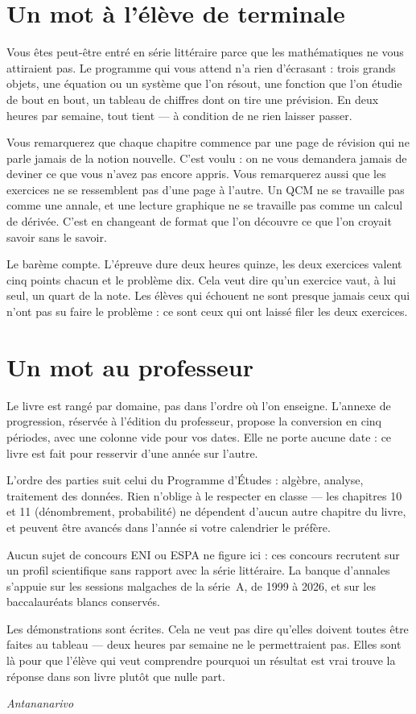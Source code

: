 \section*{Un mot à l'élève de terminale}

Vous êtes peut-être entré en série littéraire parce que les mathématiques ne
vous attiraient pas. Le programme qui vous attend n'a rien d'écrasant : trois
grands objets, une équation ou un système que l'on résout, une fonction que
l'on étudie de bout en bout, un tableau de chiffres dont on tire une
prévision. En deux heures par semaine, tout tient — à condition de ne rien
laisser passer.

Vous remarquerez que chaque chapitre commence par une page de révision qui ne
parle jamais de la notion nouvelle. C'est voulu : on ne vous demandera jamais
de deviner ce que vous n'avez pas encore appris. Vous remarquerez aussi que
les exercices ne se ressemblent pas d'une page à l'autre. Un QCM ne se
travaille pas comme une annale, et une lecture graphique ne se travaille pas
comme un calcul de dérivée. C'est en changeant de format que l'on découvre ce
que l'on croyait savoir sans le savoir.

Le barème compte. L'épreuve dure deux heures quinze, les deux exercices
valent cinq points chacun et le problème dix. Cela veut dire qu'un exercice
vaut, à lui seul, un quart de la note. Les élèves qui échouent ne sont
presque jamais ceux qui n'ont pas su faire le problème : ce sont ceux qui ont
laissé filer les deux exercices.

\section*{Un mot au professeur}

Le livre est rangé par domaine, pas dans l'ordre où l'on enseigne. L'annexe
de progression, réservée à l'édition du professeur, propose la conversion en
cinq périodes, avec une colonne vide pour vos dates. Elle ne porte aucune
date : ce livre est fait pour resservir d'une année sur l'autre.

L'ordre des parties suit celui du Programme d'Études : algèbre, analyse,
traitement des données. Rien n'oblige à le respecter en classe — les
chapitres 10 et 11 (dénombrement, probabilité) ne dépendent d'aucun autre
chapitre du livre, et peuvent être avancés dans l'année si votre calendrier
le préfère.

Aucun sujet de concours ENI ou ESPA ne figure ici : ces concours recrutent
sur un profil scientifique sans rapport avec la série littéraire. La banque
d'annales s'appuie sur les sessions malgaches de la série~A, de 1999 à 2026,
et sur les baccalauréats blancs conservés.

Les démonstrations sont écrites. Cela ne veut pas dire qu'elles doivent
toutes être faites au tableau — deux heures par semaine ne le permettraient
pas. Elles sont là pour que l'élève qui veut comprendre pourquoi un résultat
est vrai trouve la réponse dans son livre plutôt que nulle part.

\vspace{1.2em}
\noindent\textit{Antananarivo}

